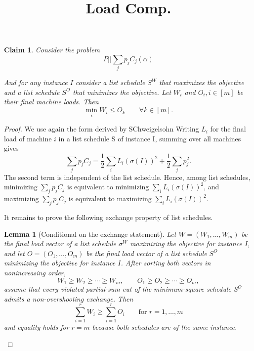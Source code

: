 \documentclass[11pt]{article}
\newtheorem*{claim}{Claim}
\newtheorem*{lemma}{Lemma}
\begin{document}
\title{Load Comp.}
\author{}
\date{}
\maketitle

\begin{claim}
Consider the problem
\[
        P||\sum_j p_j C_j(\alpha) 
\]

And for any instance $I$ consider a list schedule $S^W$ that maximizes the objective and a 
list schedule $S^O$ that minimizes the objective. Let $W_i$ and $O_i, i \in [m]$
be their final machine loads. Then
\[
        \min_i W_i \leq O_k
        \qquad \forall k  \in [m].
\]
\end{claim}

\begin{proof}
We use again the form derived by SChweigelsohn
Writing $L_i$ for the final load of machine $i$ in a list schedule S of instance I, 
summing over all machines
gives
\[
        \sum_j p_j C_j
        =
        \frac12\sum_i L_i(\sigma(I))^2
        +
        \frac12\sum_j p_j^2 .
\]
The second term is independent of the list schedule. Hence, among list
schedules, minimizing $\sum_j p_j C_j$ is equivalent to minimizing
$\sum_i L_i(\sigma(I))^2$, and maximizing $\sum_j p_j C_j$ is equivalent to maximizing
$\sum_i L_i(\sigma(I))^2$.

It remains to prove the following exchange property of list schedules.

\begin{lemma}[Conditional on the exchange statement]
Let $W=(W_1,\dots,W_m)$ be the final load vector of a list schedule $\sigma^{W}$ maximizing
the objective for instance $I$, and let $O=(O_1,\dots,O_m)$ be the final load vector of a list
schedule $S^O$ minimizing the objective for instance $I$. After sorting both vectors in nonincreasing
order,
\[
        W_1\geq W_2\geq \cdots \geq W_m,
        \qquad
        O_1\geq O_2\geq \cdots \geq O_m,
\]
assume that every violated partial-sum cut of the minimum-square schedule
\(S^O\) admits a non-overshooting exchange. Then
\[
        \sum_{i=1}^r W_i
        \geq
        \sum_{i=1}^r O_i
        \qquad
        \text{for } r=1,\dots,m
\]
and equality holds for $r=m$ because both schedules are of the same instance.
\end{lemma}


\end{proof}
\end{document}
